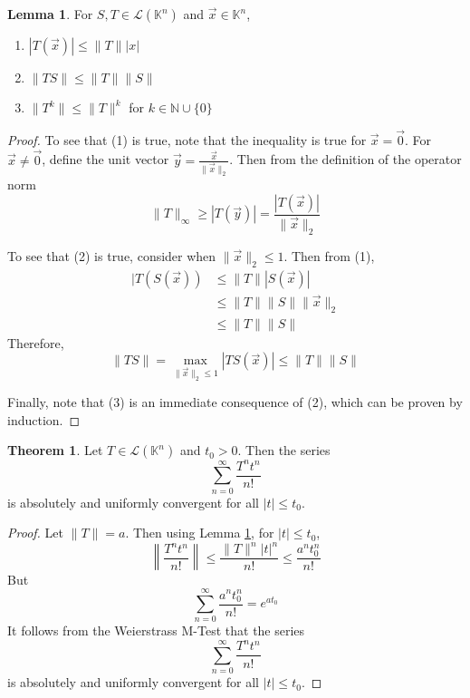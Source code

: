 \documentclass[11pt]{book}
\theoremstyle{definition}\newtheorem{definition}[subsection]{Definition}
\theoremstyle{definition}\newtheorem{example}[subsection]{Example}
\theoremstyle{definition}\newtheorem{notation}[subsection]{Notation}
\theoremstyle{definition}\newtheorem{remark}[subsection]{Remark}
\theoremstyle{theorem}\newtheorem{theorem}[subsection]{Theorem}
\theoremstyle{theorem}\newtheorem{lemma}[subsection]{Lemma}
\theoremstyle{theorem}\newtheorem{proposition}[subsection]{Proposition}
\theoremstyle{theorem}\newtheorem{corollary}[subsection]{Corollary}
\theoremstyle{theorem}\newtheorem{case}{Case}
\theoremstyle{remark}\newtheorem{subcase}{Subcase}[case]
\newcommand{\K}{\mathbb{K}}
\newcommand{\N}{\mathbb{N}}
\renewcommand{\L}{\mathscr{L}}
\begin{document}
\begin{lemma}\label{lemma:1.4.3}
    For $S, T \in \L(\K^n)$ and $\vec{x} \in \K^n$,
    \begin{enumerate}
        \item $|T(\vec{x})| \leq \|T\||x|$
        \item $\|TS\| \leq \|T\| \|S\|$
        \item $\|T^k\| \leq \|T\|^k$ for $k \in \N \cup \{0\}$
    \end{enumerate}
\end{lemma}

\begin{proof}
    To see that (1) is true, note that the inequality is true for $\vec{x} = \vec{0}$. For $\vec{x} \neq \vec{0}$, define the unit vector $\vec{y} = \frac{\vec{x}}{\|\vec{x}\|_2}$. Then from the definition of the operator norm
    \begin{equation*}
        \|T\|_{\infty} \geq |T(\vec{y})| = \frac{|T(\vec{x})|}{\|\vec{x}\|_2}
    \end{equation*}

    To see that (2) is true, consider when $\|\vec{x}\|_2 \leq 1$. Then from (1),
    \begin{align*}
        |T(S(\vec{x})) &\leq \|T\||S(\vec{x})| \\
        &\leq \|T\|\|S\| \|\vec{x}\|_2 \\
        &\leq \|T\| \|S\|
    \end{align*}
    Therefore,
    \begin{equation*}
        \|TS\| = \max_{\|\vec{x}\|_2 \leq 1} |TS(\vec{x})| \leq \|T\| \|S\|
    \end{equation*}

    Finally, note that (3) is an immediate consequence of (2), which can be proven by induction.
\end{proof}

\begin{theorem}\label{theorem:1.4.4}
    Let $T \in \L(\K^n)$ and $t_0 > 0$. Then the series
    \begin{equation*}
        \sum_{n = 0}^{\infty} \frac{T^n t^n}{n!}
    \end{equation*}
    is absolutely and uniformly convergent for all $|t| \leq t_0$.
\end{theorem}

\begin{proof}
    Let $\|T\| = a$. Then using Lemma \ref{lemma:1.4.3}, for $|t| \leq t_0$,
    \begin{equation*}
        \left\|\frac{T^n t^n}{n!}\right\| \leq \frac{\|T\|^n |t|^n}{n!} \leq \frac{a^n t_0^n}{n!}
    \end{equation*}
    But
    \begin{equation*}
        \sum_{n = 0}^{\infty} \frac{a^nt_0^n}{n!} = e^{at_0}
    \end{equation*}
    It follows from the Weierstrass M-Test that the series
    \begin{equation*}
        \sum_{n = 0}^{\infty} \frac{T^n t^n}{n!}
    \end{equation*}
    is absolutely and uniformly convergent for all $|t| \leq t_0$.
\end{proof}
\end{document}
